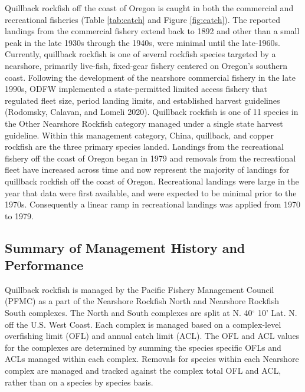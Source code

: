 \documentclass[11pt,
  english,
  a4paper,
]{article}
\begin{document}
Quillback rockfish off the coast of Oregon is caught in both the commercial and recreational fisheries (Table \ref{tab:catch} and Figure \ref{fig:catch}). The reported landings from the commercial fishery extend back to 1892 and other than a small peak in the late 1930s through the 1940s, were minimal until the late-1960s. Currently, quillback rockfish is one of several rockfish species targeted by a nearshore, primarily live-fish, fixed-gear fishery centered on Oregon's southern coast. Following the development of the nearshore commercial fishery in the late 1990s, ODFW implemented a state-permitted limited access fishery that regulated fleet size, period landing limits, and established harvest guidelines {(Rodomsky, Calavan, and Lomeli 2020)\leavevmode\tagmcend\tagstructend}. Quillback rockfish is one of 11 species in the Other Nearshore Rockfish category managed under a single state harvest guideline. Within this management category, China, quillback, and copper rockfish are the three primary species landed. Landings from the recreational fishery off the coast of Oregon began in 1979 and removals from the recreational fleet have increased across time and now represent the majority of landings for quillback rockfish off the coast of Oregon. Recreational landings were large in the year that data were first available, and were expected to be minimal prior to the 1970s. Consequently a linear ramp in recreational landings was applied from 1970 to 1979.

\leavevmode\tagmcend\tagstructend\par


\hypertarget{summary-of-management-history-and-performance}{%
\subsection{Summary of Management History and Performance}\label{summary-of-management-history-and-performance}}

\leavevmode\tagmcend\tagstructend


Quillback rockfish is managed by the Pacific Fishery Management Council (PFMC) as a part of the Nearshore Rockfish North and Nearshore Rockfish South complexes. The North and South complexes are split at N. 40{\(^\circ\)\leavevmode\tagmcend\tagstructend} 10' Lat. N. off the U.S. West Coast. Each complex is managed based on a complex-level overfishing limit (OFL) and annual catch limit (ACL). The OFL and ACL values for the complexes are determined by summing the species specific OFLs and ACLs managed within each complex. Removals for species within each Nearshore complex are managed and tracked against the complex total OFL and ACL, rather than on a species by species basis.
\end{document}

